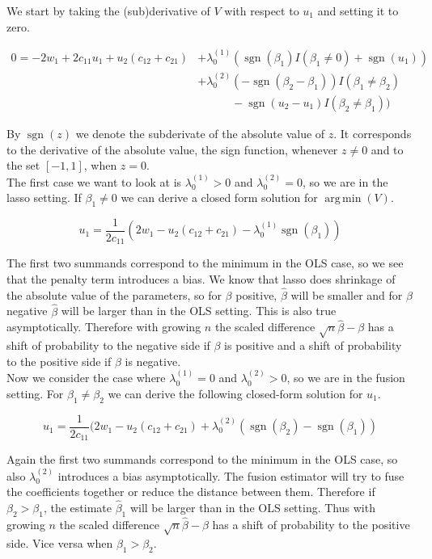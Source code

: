 \documentclass{article}
\theoremstyle{definition}
\DeclareMathOperator*{\argmin}{arg\,min}
\DeclareMathOperator*{\sgn}{sgn}
\begin{document}
We start by taking the (sub)derivative of $V$ with respect to $u_1$ and setting it to zero.

\begin{align} \label{eq: subder}
	0 = -2w_1 + 2c_{11}u_1 + u_2 (c_{12}+c_{21}) &+ \lambda_0^{(1)}(\sgn(\beta_1) I(\beta_1 \neq 0) + \sgn(u_1)) \nonumber\\
	 &+ \lambda_0^{(2)} (-\sgn(\beta_2-\beta_1))I(\beta_1 \neq \beta_2) \nonumber\\
	 & \quad \quad \quad - \sgn(u_2-u_1)I(\beta_2 \neq \beta_1)) 
\end{align}

\noindent By $\sgn(z)$ we denote the subderivate of the absolute value of $z$. It corresponds to the derivative of the absolute value, the sign function, whenever $z \neq 0$ and to the set $[-1,1]$, when $z=0$.\\

The first case we want to look at is $\lambda_0^{(1)} > 0$ and $\lambda_0^{(2)} = 0$, so we are in the lasso setting. If $\beta_1 \neq 0$ we can derive a closed form solution for $\argmin(V)$.

\begin{equation}
	u_1 = \frac{1}{2c_{11}} (2w_1 - u_2(c_{12}+c_{21})-\lambda_0^{(1)} \sgn(\beta_1))
\end{equation}

\noindent The first two summands correspond to the minimum in the OLS case, so we see that the penalty term introduces a bias. We know that lasso does shrinkage of the absolute value of the parameters, so for $\beta$ positive, $\hat{\beta}$ will be smaller and for $\beta$ negative $\hat{\beta}$ will be larger than in the OLS setting. This is also true asymptotically. Therefore with growing $n$ the scaled difference $\sqrt{n}\hat{\beta} - \beta$ has a shift of probability to the negative side if $\beta$ is positive and a shift of probability to the positive side if $\beta$ is negative.\\

Now we consider the case where $\lambda_0^{(1)} = 0$ and $\lambda_0^{(2)} > 0$, so we are in the fusion setting. For $\beta_1 \neq \beta_2$ we can derive the following closed-form solution for $u_1$.

\begin{equation}
u_1 = \frac{1}{2c_{11}} (2w_1 - u_2(c_{12}+c_{21})+\lambda_0^{(2)} (\sgn(\beta_2)-\sgn(\beta_1))
\end{equation}

\noindent Again the first two summands correspond to the minimum in the OLS case, so also $\lambda_0^{(2)}$ introduces a bias asymptotically. The fusion estimator will try to fuse the coefficients together or reduce the distance between them. Therefore if $\beta_2 > \beta_1$, the estimate $\hat{\beta}_1$ will be larger than in the OLS setting. Thus with growing $n$ the scaled difference $\sqrt{n}\hat{\beta} - \beta$ has a shift of probability to the positive side. Vice versa when $\beta_1 > \beta_2$.
\end{document}
